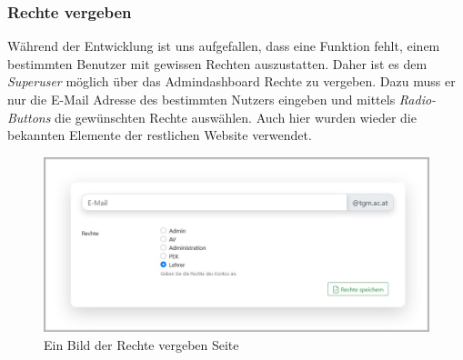 \newpage 
\subsubsection{Rechte vergeben}
\label{chapter:implementierung-frontend-komponenten-rechte}
Während der Entwicklung ist uns aufgefallen, dass eine Funktion fehlt, einem bestimmten Benutzer mit gewissen Rechten auszustatten. Daher ist es dem \textit{Superuser} möglich über das Admindashboard Rechte zu vergeben. Dazu muss er nur die E-Mail Adresse des bestimmten Nutzers eingeben und mittels \textit{Radio-Buttons} die gewünschten Rechte auswählen. Auch hier wurden wieder die bekannten Elemente der restlichen Website verwendet.
\begin{figure}[H]
	\centering
	\includegraphics[width=1\linewidth]{images/website/rechte}
	\caption[Rechte vergeben Seite]{Ein Bild der Rechte vergeben Seite}
	\label{fig:rightssite}
\end{figure}
